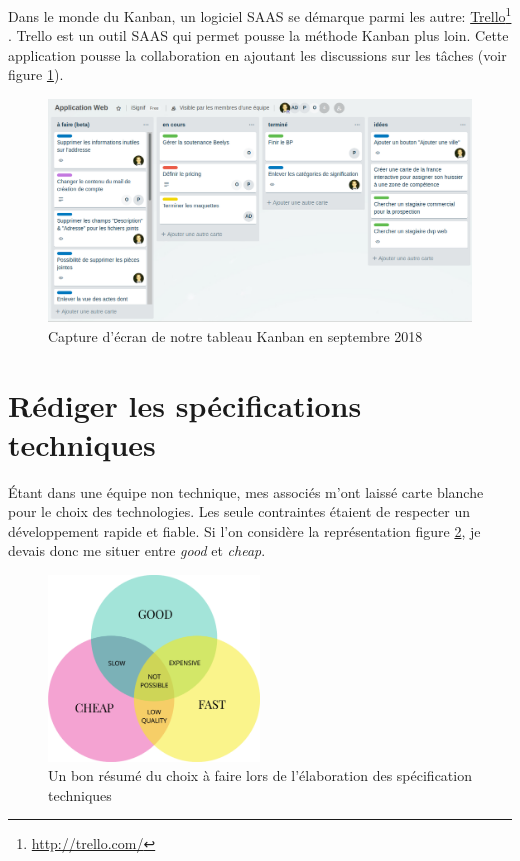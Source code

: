 \documentclass[]{report}
\newcommand\fnurl[2]{%
  \href{#1}{#2}\footnote{\url{#1}}%
}
\begin{document}
      Dans le monde du Kanban, un logiciel SAAS se démarque parmi les autre: \fnurl{http://trello.com/}{Trello}. Trello est un outil SAAS qui permet pousse la méthode Kanban plus loin. Cette application pousse la collaboration en ajoutant les discussions sur les tâches (voir figure \ref{fig:trello}).

      \begin{figure}
        \includegraphics[width=\linewidth]{img/trello.png}
        \caption{Capture d'écran de notre tableau Kanban en septembre 2018}
        \label{fig:trello}
      \end{figure}

  \section{Rédiger les spécifications techniques}

    Étant dans une équipe non technique, mes associés m'ont laissé carte blanche pour le choix des technologies. Les seule contraintes étaient de respecter un développement rapide et fiable. Si l'on considère la représentation figure \ref{fig:good_cheap_fast}, je devais donc me situer entre \textit{good} et \textit{cheap}.

    \begin{figure}
      \includegraphics[width=0.5\textwidth]{img/good_cheap_fast.png}
      \caption{Un bon résumé du choix à faire lors de l'élaboration des spécification techniques}
      \label{fig:good_cheap_fast}
    \end{figure}
\end{document}
